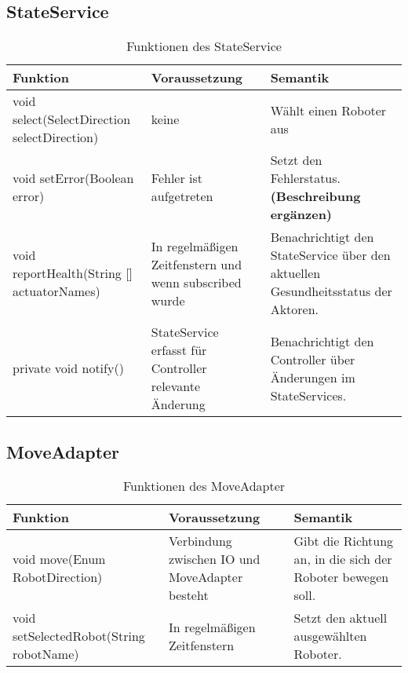    \subsection{StateService}
    \begin{table}[h!]
        \centering
        \begin{tabular}{|p{5cm}|p{5cm}|p{5cm}|}
            \hline
            \textbf{Funktion} & \textbf{Voraussetzung} & \textbf{Semantik} \\
            \hline
            void select(SelectDirection selectDirection) & keine & Wählt einen Roboter aus \\
            \hline
            void setError(Boolean error) & Fehler ist aufgetreten & Setzt den Fehlerstatus. \textbf{(Beschreibung ergänzen)} \\
            \hline
            void reportHealth(String [] actuatorNames) & In regelmäßigen Zeitfenstern und wenn subscribed wurde & Benachrichtigt den StateService über den aktuellen Gesundheitsstatus der Aktoren. \\
            \hline
            private void notify() & StateService erfasst für Controller relevante Änderung & Benachrichtigt den Controller über Änderungen im StateServices. \\
            \hline
        \end{tabular}
        \caption{Funktionen des StateService}
        \label{tab:StateService}
    \end{table}


\clearpage
    \subsection{MoveAdapter}
    \begin{table}[h!]
        \centering
        \begin{tabular}{|p{5cm}|p{5cm}|p{5cm}|}
            \hline
            \textbf{Funktion} & \textbf{Voraussetzung} & \textbf{Semantik} \\
            \hline
            void move(Enum RobotDirection) & Verbindung zwischen IO und MoveAdapter besteht & Gibt die Richtung an, in die sich der Roboter bewegen soll. \\
            \hline
            void setSelectedRobot(String robotName) & In regelmäßigen Zeitfenstern & Setzt den aktuell ausgewählten Roboter.\\
            \hline
        \end{tabular}
        \caption{Funktionen des MoveAdapter}
        \label{tab:MoveAdapter}
    \end{table}

